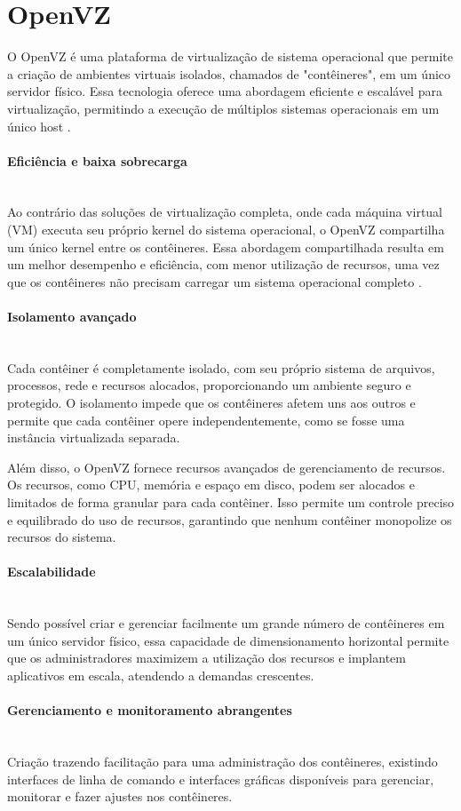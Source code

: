 \section{OpenVZ}

O OpenVZ é uma plataforma de virtualização de sistema operacional que permite a criação de ambientes virtuais isolados, chamados de "contêineres", em um único servidor físico. Essa tecnologia oferece uma abordagem eficiente e escalável para virtualização, permitindo a execução de múltiplos sistemas operacionais em um único host \cite{openvz-docs}.

\paragraph*{Eficiência e baixa sobrecarga}\mbox{}\\
 Ao contrário das soluções de virtualização completa, onde cada máquina virtual (VM) executa seu próprio kernel do sistema operacional, o OpenVZ compartilha um único kernel entre os contêineres. Essa abordagem compartilhada resulta em um melhor desempenho e eficiência, com menor utilização de recursos, uma vez que os contêineres não precisam carregar um sistema operacional completo \cite{openvz-docs}.


\paragraph*{Isolamento avançado}\mbox{}\\
Cada contêiner é completamente isolado, com seu próprio sistema de arquivos, processos, rede e recursos alocados, proporcionando um ambiente seguro e protegido. O isolamento impede que os contêineres afetem uns aos outros e permite que cada contêiner opere independentemente, como se fosse uma instância virtualizada separada.

Além disso, o OpenVZ fornece recursos avançados de gerenciamento de recursos. Os recursos, como CPU, memória e espaço em disco, podem ser alocados e limitados de forma granular para cada contêiner. Isso permite um controle preciso e equilibrado do uso de recursos, garantindo que nenhum contêiner monopolize os recursos do sistema.


\paragraph*{Escalabilidade}\mbox{}\\
Sendo possível criar e gerenciar facilmente um grande número de contêineres em um único servidor físico, essa capacidade de dimensionamento horizontal permite que os administradores maximizem a utilização dos recursos e implantem aplicativos em escala, atendendo a demandas crescentes.

\paragraph*{Gerenciamento e monitoramento abrangentes}\mbox{}\\
 Criação trazendo  facilitação para uma administração dos contêineres, existindo interfaces de linha de comando e interfaces gráficas disponíveis para gerenciar, monitorar e fazer ajustes nos contêineres.